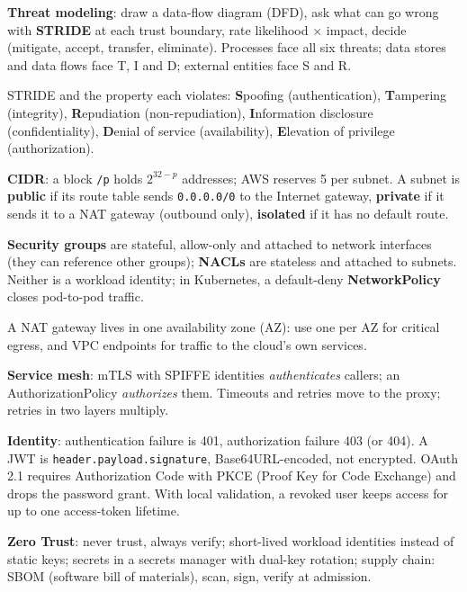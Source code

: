 \stages{\stDesign\ \stDeep}

\begin{know}
  \item \textbf{Threat modeling}: draw a data-flow diagram (DFD), ask what can go wrong with \textbf{STRIDE} at each trust boundary, rate likelihood $\times$ impact, decide (mitigate, accept, transfer, eliminate). Processes face all six threats; data stores and data flows face T, I and D; external entities face S and R.
  \item STRIDE and the property each violates: \textbf{S}poofing (authentication), \textbf{T}ampering (integrity), \textbf{R}epudiation (non-repudiation), \textbf{I}nformation disclosure (confidentiality), \textbf{D}enial of service (availability), \textbf{E}levation of privilege (authorization).
  \item \textbf{CIDR}: a block \texttt{/p} holds $2^{32-p}$ addresses; AWS reserves 5 per subnet. A subnet is \textbf{public} if its route table sends \texttt{0.0.0.0/0} to the Internet gateway, \textbf{private} if it sends it to a NAT gateway (outbound only), \textbf{isolated} if it has no default route.
  \item \textbf{Security groups} are stateful, allow-only and attached to network interfaces (they can reference other groups); \textbf{NACLs} are stateless and attached to subnets. Neither is a workload identity; in Kubernetes, a default-deny \textbf{NetworkPolicy} closes pod-to-pod traffic.
  \item A NAT gateway lives in one availability zone (AZ): use one per AZ for critical egress, and VPC endpoints for traffic to the cloud's own services.
  \item \textbf{Service mesh}: mTLS with SPIFFE identities \emph{authenticates} callers; an AuthorizationPolicy \emph{authorizes} them. Timeouts and retries move to the proxy; retries in two layers multiply.
  \item \textbf{Identity}: authentication failure is 401, authorization failure 403 (or 404). A JWT is \texttt{header.payload.signature}, Base64URL-encoded, not encrypted. OAuth 2.1 requires Authorization Code with PKCE (Proof Key for Code Exchange) and drops the password grant. With local validation, a revoked user keeps access for up to one access-token lifetime.
  \item \textbf{Zero Trust}: never trust, always verify; short-lived workload identities instead of static keys; secrets in a secrets manager with dual-key rotation; supply chain: SBOM (software bill of materials), scan, sign, verify at admission.
\end{know}

